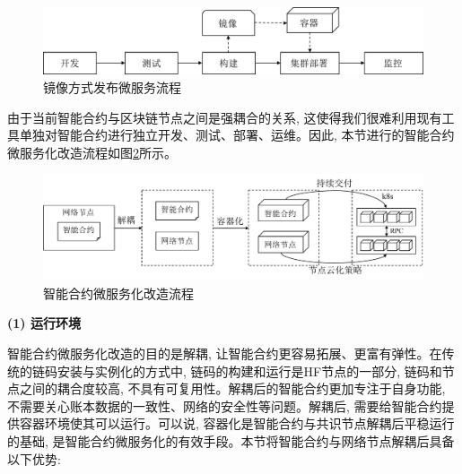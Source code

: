 \begin{figure}[h] %
    \centering %
    \includegraphics[width=1.0\textwidth]{FIGs/chapter4/deploy_micro_by_container.pdf} %
    \caption{镜像方式发布微服务流程} %
    \label{deploy_micro_by_container} %
\end{figure}%

由于当前智能合约与区块链节点之间是强耦合的关系, 这使得我们很难利用现有工具单独对智能合约进行独立开发、测试、部署、运维。因此, 
本节进行的智能合约微服务化改造流程如图\ref{microservice_for_sc}所示。

\begin{figure}[h] %
    \centering %
    \includegraphics[width=1.0\textwidth]{FIGs/chapter4/microservice_for_sc.pdf} %
    \caption{智能合约微服务化改造流程} %
    \label{microservice_for_sc} %
\end{figure}%

\textbf{(1) 运行环境}

智能合约微服务化改造的目的是解耦, 让智能合约更容易拓展、更富有弹性。在传统的链码安装与实例化的方式中, 链码的构建和运行是HF节点的一部分, 链码和节点之间的耦合度较高, 不具有可复用性。解耦后的智能合约更加专注于自身功能, 不需要关心账本数据的一致性、网络的安全性等问题。解耦后, 需要给智能合约提供容器环境使其可以运行。可以说, 容器化是智能合约与共识节点解耦后平稳运行的基础, 是智能合约微服务化的有效手段。本节将智能合约与网络节点解耦后具备以下优势:

